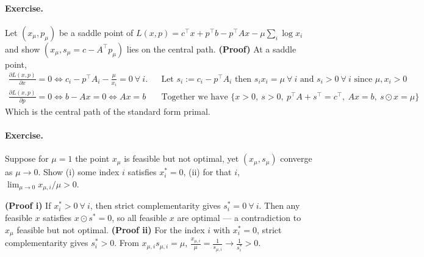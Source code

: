\documentclass{article}
\begin{document}
\paragraph{Exercise.}
Let $(x_\mu,p_\mu)$ be a saddle point of $L(x,p)=c^\top x+p^\top b - p^\top A x - \mu\sum_i\log x_i$ and show $(x_\mu,s_\mu=c-A^\top p_\mu)$ lies on the central path.
\textbf{(Proof)} At a saddle point,
\begin{align*}
    \tfrac{\partial L(x,p)}{\partial x} = 0 \iff c_i -p^\top A_i - \tfrac{\mu}{x_i} = 0\ \forall\ i. && \text{Let } s_i := c_i - p^\top A_i\text{ then } s_ix_i = \mu\ \forall\ i \text{ and } s_i> 0\ \forall\ i \text{ since } \mu,x_i > 0 \\
    \tfrac{\partial L(x,p)}{\partial p} = 0 \iff b - Ax = 0 \iff Ax = b && \text{Together we have } \{x> 0,\ s>0,\ p^\top A + s^\top = c^\top,\ Ax=b,\ s\odot x = \mu\}
\end{align*}
Which is the central path of the standard form primal. 

\paragraph{Exercise.}
Suppose for $\mu=1$ the point $x_\mu$ is feasible but not optimal, yet $(x_\mu,s_\mu)$ converge as $\mu\to0$. Show  
(i) some index $i$ satisfies $x_i^*=0$,  
(ii) for that $i$, $\lim_{\mu\to0} x_{\mu,i}/\mu >0$.

\textbf{(Proof i)}  
If $x_i^*>0\ \forall\ i$, then strict complementarity gives $s_i^*=0\ \forall\ i$.  
Then any feasible $x$ satisfies $x\odot s^*=0$, so all feasible $x$ are optimal — a contradiction to $x_\mu$ feasible but not optimal.
\textbf{(Proof ii)}  
For the index $i$ with $x_i^*=0$, strict complementarity gives $s_i^*>0$.  
From $x_{\mu,i}s_{\mu,i}=\mu$, $\frac{x_{\mu,i}}{\mu} = \frac{1}{s_{\mu,i}} \to \frac{1}{s_i^*} >0$.
\end{document}
